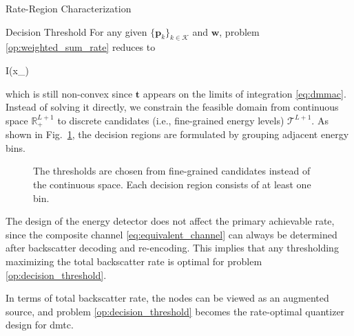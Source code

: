 \begin{section}{Rate-Region Characterization}
	\begin{subsection}{Decision Threshold}
		For any given $\{\boldsymbol{p}_k\}_{k \in \mathcal{K}}$ and $\boldsymbol{w}$, problem \eqref{op:weighted_sum_rate} reduces to
		\begin{maxi!}
			{}{I(x_{})}{\label{op:decision_threshold}}{\label{ob:decision_threshold}}
			\addConstraint{\eqref{co:sequential_threshold},\eqref{co:nonnegative_threshold},}
		\end{maxi!}
		which is still non-convex since $\boldsymbol{t}$ appears on the limits of integration \eqref{eq:dmmac}.
		Instead of solving it directly, we constrain the feasible domain from continuous space $\mathbb{R}_+^{L+1}$ to discrete candidates (i.e., fine-grained energy levels) $\mathcal{T}^{L+1}$.
		As shown in Fig.~\ref{fg:discrete_outputs}, the decision regions are formulated by grouping adjacent energy bins.
		\begin{figure}[!t]
			\centering
			\resizebox{0.9\columnwidth}{!}{
				
			}
			\caption{The thresholds are chosen from fine-grained candidates instead of the continuous space. Each decision region consists of at least one bin.}
			\label{fg:discrete_outputs}
		\end{figure}

		\begin{remark}
			The design of the energy detector does not affect the primary achievable rate, since the composite channel \eqref{eq:equivalent_channel} can always be determined after backscatter decoding and re-encoding.
			This implies that any thresholding maximizing the total backscatter rate is optimal for problem \eqref{op:decision_threshold}.
			\label{re:backscatter_decision}
		\end{remark}

		\begin{remark}
			In terms of total backscatter rate, the nodes can be viewed as an augmented source, and problem \eqref{op:decision_threshold} becomes the rate-optimal quantizer design for \gls{dmtc}.
			\label{re:augmented_source}
		\end{remark}


\end{subsection}
\end{section}
